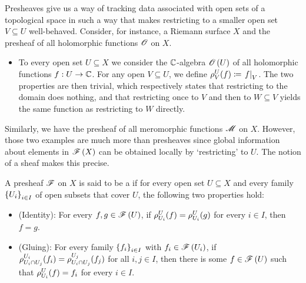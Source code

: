 \documentclass[../Moduli_Spaces_of_Riemann_Surfaces.tex]{subfiles}
\begin{document}
    \begin{remark}
        Presheaves give us a way of tracking data associated with open sets of a topological space in such a way that makes restricting to a smaller open set $V\subseteq U$ well-behaved. Consider, for instance, a Riemann surface $X$ and the presheaf of all holomorphic functions $\mathscr{O}$ on $X$.
        \begin{itemize}
            \item To every open set $U\subseteq X$ we consider the $\mathbb{C}$-algebra $\mathscr{O}\left(U\right)$ of all holomorphic functions $f:U\to\mathbb{C}$. For any open $V\subseteq U$, we define $\rho^U_V\!\left(f\right)\coloneqq\left.f\right|_V$. The two properties are then trivial, which respectively states that restricting to the domain does nothing, and that restricting once to $V$ and then to $W\subseteq V$ yields the same function as restricting to $W$ directly.
        \end{itemize}
        Similarly, we have the presheaf of all meromorphic functions $\mathscr{M}$ on $X$. However, those two examples are much more than presheaves since global information about elements in $\mathscr{F}\left(X\right)$ can be obtained locally by `restricting' to $U$. The notion of a sheaf makes this precise.\exqed
    \end{remark}
    \begin{definition}
        A presheaf $\mathscr{F}$ on $X$ is said to be a  if for every open set $U\subseteq X$ and every family $\left\{U_i\right\}_{i\in I}$ of open subsets that cover $U$, the following two properties hold:
        \begin{itemize}
            \item (Identity): For every $f,g\in\mathscr{F}\left(U\right)$, if $\rho^U_{U_i}\!\left(f\right)=\rho^U_{U_i}\!\left(g\right)$ for every $i\in I$, then $f=g$.
                \vspace{-0.05in}
            \item (Gluing): For every family $\left\{f_i\right\}_{i\in I}$ with $f_i\in\mathscr{F}\left(U_i\right)$, if $\rho^{U_i}_{U_i\cap U_j}\!\left(f_i\right)=\rho^{U_j}_{U_i\cap U_j}\!\left(f_j\right)$ for all $i,j\in I$, then there is some $f\in\mathscr{F}\left(U\right)$ such that $\rho^U_{U_i}\!\left(f\right)=f_i$ for every $i\in I$.
        \end{itemize}
    \end{definition}
\end{document}
